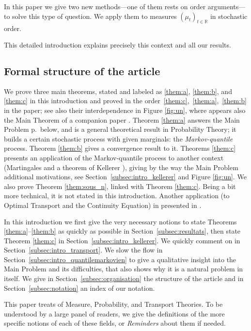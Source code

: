 \documentclass[JEP,XML,SOM,Unicode,NoEqCountersInSection,NoFloatCountersInSection,published]{cedram}
\theoremstyle{plain}
\theoremstyle{definition}
\newcommand{\R}{\mathbb{R}}
\begin{document}
In this paper we give two new methods---one of them rests on order arguments---to solve this type of question. We apply them to measures $(\mu_t)_{t\in\R}$ in stochastic order.

This detailed introduction explains precisely this context and all our results.

\subsection{Formal structure of the article}\label{subsec:formal} We prove three main theorems, stated and labeled as \ref{them:a}, \ref{them:b}, and \ref{them:c} in this introduction and proved in the order~\ref{them:c},~\ref{them:a},~\ref{them:b} in the paper; see also their interdependence in Figure \ref{fig:un}, where appears also the Main Theorem of a companion paper \cite{BouJui2}. Theorem \ref{them:a} answers the Main Problem p.\,\pageref{problem} below, and is a general theoretical result in Probability Theory; it builds a certain stochastic process with given marginals: the \emph{Markov-quantile} process. Theorem \ref{them:b} gives a convergence result to it. Theorems \ref{them:c} presents an application of the Markov-quantile process to another context (Martingales and a theorem of Kellerer \cite{Ke72,Ke73}), giving by the way the Main Problem additional motivations, see Section~\ref{subsec:intro_kellerer} and Figure \ref{fig:un}. We also prove Theorem \ref{them:sous_n}, linked with Theorem \ref{them:c}. Being a bit more technical, it is not stated in this introduction. Another application (to Optimal Transport and the Continuity Equation) in presented in \cite{BouJui2}.

In this introduction we first give the very necessary notions to state Theorems \ref{them:a}--\ref{them:b} as quickly as possible in Section~\ref{subsec:resultats}, then state Theorem \ref{them:c} in Section~\ref{subsec:intro_kellerer}. We quickly comment on \cite{BouJui2} in Section~\ref{subsec:intro_transport}. We slow the flow in Section~\ref{subsec:intro_quantilemarkovien} to give a qualitative insight into the Main Problem and its difficulties, that also shows why it is a natural problem in itself. We give in Section~\ref{subsec:organisation} the structure of the article and in Section~\ref{subsec:notation} an index of our notation.

This paper treats of Measure, Probability, and Transport Theories. To be understood by a large panel of readers, we give the definitions of the more specific notions of each of these fields, or \emph{Reminders} about them if needed.
\end{document}
